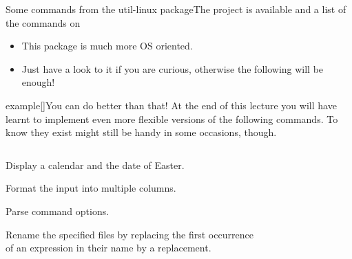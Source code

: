 \begin{frame}{Some commands from the util-linux package}{The project is available  and a list of the commands on }
    \vspace{-1mm}
    \begin{itemize}
        \item This package is much more OS oriented.
        \item Just have a look to it if you are curious, otherwise the following will be enough!
    \end{itemize}
    \vspace{-1mm}
    \begin{varblock}{example}[\textwidth]{You can do better than that!}
        At the end of this lecture you will have learnt to implement even more flexible versions of the following commands.
        To know they exist might still be handy in some occasions, though.
    \end{varblock}
    \vspace{-5mm}
    \begin{columns}
        \begin{column}{\dimexpr\paperwidth-10mm}
            \small
            \begin{description}
                \setlength{\itemsep}{1mm}
                \item[\PB{\texttt{cal}}]
                    Display a calendar and the date of Easter.
                \item[\PB{\texttt{column}}]
                    Format the input into multiple columns.
                \item[\PB{\texttt{getopt}}]
                    Parse command options.
                \item[\PB{\texttt{rename}}]
                    Rename the specified files by replacing the first occurrence\\ of an expression in their name by a replacement.
            \end{description}
        \end{column}
    \end{columns}
\end{frame}
